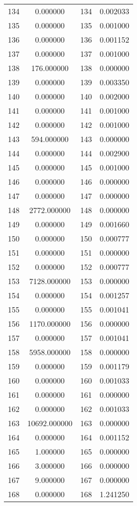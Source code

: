 \documentclass[12pt]{article}
\begin{document}
\begin{longtable}{@{}cccc@{}}
134 & 0.000000 & 134 & 0.002033 \\
135 & 0.000000 & 135 & 0.001000 \\
136 & 0.000000 & 136 & 0.001152 \\
137 & 0.000000 & 137 & 0.001000 \\
138 & 176.000000 & 138 & 0.000000 \\
139 & 0.000000 & 139 & 0.003350 \\
140 & 0.000000 & 140 & 0.002000 \\
141 & 0.000000 & 141 & 0.001000 \\
142 & 0.000000 & 142 & 0.001000 \\
143 & 594.000000 & 143 & 0.000000 \\
144 & 0.000000 & 144 & 0.002900 \\
145 & 0.000000 & 145 & 0.001000 \\
146 & 0.000000 & 146 & 0.000000 \\
147 & 0.000000 & 147 & 0.000000 \\
148 & 2772.000000 & 148 & 0.000000 \\
149 & 0.000000 & 149 & 0.001660 \\
150 & 0.000000 & 150 & 0.000777 \\
151 & 0.000000 & 151 & 0.000000 \\
152 & 0.000000 & 152 & 0.000777 \\
153 & 7128.000000 & 153 & 0.000000 \\
154 & 0.000000 & 154 & 0.001257 \\
155 & 0.000000 & 155 & 0.001041 \\
156 & 1170.000000 & 156 & 0.000000 \\
157 & 0.000000 & 157 & 0.001041 \\
158 & 5958.000000 & 158 & 0.000000 \\
159 & 0.000000 & 159 & 0.001179 \\
160 & 0.000000 & 160 & 0.001033 \\
161 & 0.000000 & 161 & 0.000000 \\
162 & 0.000000 & 162 & 0.001033 \\
163 & 10692.000000 & 163 & 0.000000 \\
164 & 0.000000 & 164 & 0.001152 \\
165 & 1.000000 & 165 & 0.000000 \\
166 & 3.000000 & 166 & 0.000000 \\
167 & 9.000000 & 167 & 0.000000 \\
168 & 0.000000 & 168 & 1.241250 \\

\end{longtable}
\end{document}
